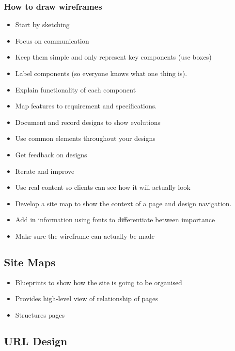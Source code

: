 \subsubsection{How to draw wireframes}\label{ssub:how_to_draw_wireframes}

\begin{itemize}
    \item Start by sketching
    \item Focus on communication
    \item Keep them simple and only represent key components (use boxes)
    \item Label components (so everyone knows what one thing is).
    \item Explain functionality of each component
    \item Map features to requirement and specifications.
    \item Document and record designs to show evolutions
    \item Use common elements throughout your designs
    \item Get feedback on designs
    \item Iterate and improve
    \item Use real content so clients can see how it will actually look
    \item Develop a site map to show the context of a page and design navigation.
    \item Add in information using fonts to differentiate between importance
    \item Make sure the wireframe can actually be made
\end{itemize}

\subsection{Site Maps}\label{sub:site_maps_was}

\begin{itemize}
    \item Blueprints to show how the site is going to be organised
    \item Provides high-level view of relationship of pages
    \item Structures pages
\end{itemize}

\subsection{URL Design}\label{sub:url_design_was}


